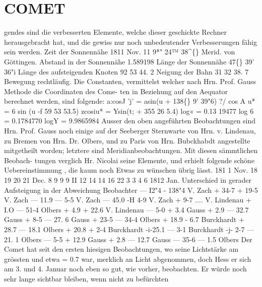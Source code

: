 \documentclass[12pt,a4paper]{article}
\newcommand{\degree}{\textdegree}
\begin{document}
\section*{COMET}
gendes  sind  die  verbesserten  Elemente,   welche  dieser  geschickte  Rechner  herausgebracht  hat,   und  die 
gewiss  nur  noch  unbedeutender  Verbesserungen  fähig  sein  werden. 
Zeit  der  Sonnennähe  1811  Nov.  11     9*"  24™  38\textasciicircum\{\}  Merid.  von  Göttingen. 
Abstand  in  der  Sonnennähe   
1.589198 
Länge  der  Sonnennähe   
47\degree\{\}  39'   36"i 
Länge  des  aufsteigenden  Knoten   
92    53    44. 2 
Neigung  der  Bahn   
31    32    38. 7 
Bewegung  rechtläufig. 
Die  Constanten,  vermittelst  welcher  nach  Hrn.  Prof.  Gauss  Methode  die  Coordinaten  des  Come- 
ten  in  Beziehung  auf  den  Aequator  berechnet  werden,  sind  folgende: 
a:cosJ 'j'  =  asin(u  + 138\degree\{\}  9'  39"6) 
?/ cos  A  u*  =  6  sin  (u -f  59  53  53.5) 
zcosiu*  =  Ysin(t;  +  355    26      5.4) 
log«  =  0.13 19477 
log  6  =  0.1784770 
logY  =  9.9865984 
Ausser  den  oben  angeführten  Beobachtungen  sind  Hrn.  Prof.  Gauss  noch  einige  auf  der  Seeberger 
Sternwarte  von  Hrn.  v.  Lindenau,  zu  Bremen  von  Hrn.  Dr.  Olbers,  und  zu  Paris  von  Hrn.  Bubckhabdt 
angestellte  mitgetheilt  worden;  letztere  sind  Meridianbeobachtungen.  Mit  diesen  sämmtlichen  Beobach- 
tungen verglich  Hr.  Nicolai  seine  Elemente,  und  erhielt  folgende  schöne  Uebereinstimmung ,  die  kaum 
noch  Etwas  zu  wünschen  übrig  lässt. 
181 1  Nov. 18 
19 
20 
21 
Dec.    8 
9 
9 
9 
II 
12 
14 
14 
16 
22 
3 
3 
4 
6 
1812  Jan. 
Unterschied 
in  gerader 
Aufsteigung 
in  der 
Abweichung 
Beobachter 
---  I2"4 
- 138"4 
V.  Zach 
+  34-7 
+    19-5 
V.  Zach 
---  11.9 
---     5-5 
V.  Zach 
---  45.0 
-H      4-9 
V.  Zach 
+    9-7 
.... 
V.  Lindenau 
+      I.O 
---    51-4 
Olbers 
+    4.9 
+    22.6 
V.  Lindenau 
---    5-0 
+      3.4 
Gauss 
+    2.9 
---    32.7 
Gauss 
+    8-5 
---    27.  6 
Gauss 
+  23-5 
---    34-4 
Olbers 
+  18.9 
-      6.7 
Burckhardt 
+  28.7 
---    18.1 
Olbers 
+  20.8 
+        2-4 
Burckhardt 
-i-25.1 
---      3-1 
Burckhardt 
-j-      2-7 
---    21. 1 
Olbers 
---    5-5 
+    12.9 
Gauss 
+    2.8 
---    12.7 
Gauss 
---  35-6 
---      1.5 
Olbers 
Der  Comet  hat  seit  den  ersten  hiesigen  Beobachtungen,  wo  seine  Lichtstärke  am  grössten  und 
etwa  =  0.7  war,  merklich  an  Licht  abgenommen,  doch  Hess  er  sich  am  3.  und  4.  Januar  noch  eben  so 
gut,  wie  vorher,  beobachten.     Er  würde  noch  sehr  lange  sichtbar  bleiben,   wenn  nicht   zu  befürchten 
\end{document}
